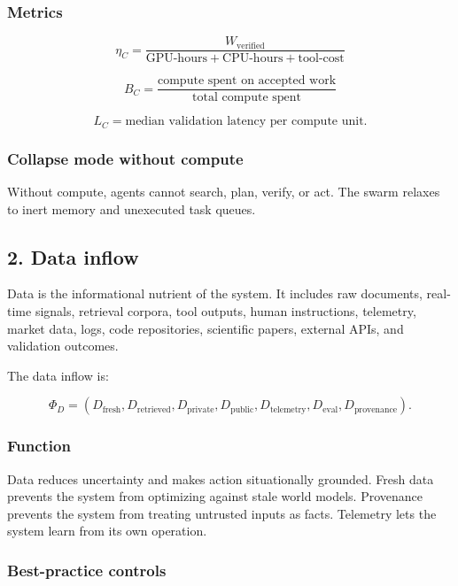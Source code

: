 \documentclass[11pt]{article}
\begin{document}
\subsubsection{Metrics}\label{metrics}

\[
\eta_C=\frac{W_{\text{verified}}}{\text{GPU-hours}+\text{CPU-hours}+\text{tool-cost}}
\]

\[
B_C=\frac{\text{compute spent on accepted work}}{\text{total compute spent}}
\]

\[
L_C=\text{median validation latency per compute unit}.
\]

\subsubsection{Collapse mode without
compute}\label{collapse-mode-without-compute}

Without compute, agents cannot search, plan, verify, or act. The swarm
relaxes to inert memory and unexecuted task queues.

\subsection{2. Data inflow}\label{data-inflow}

Data is the informational nutrient of the system. It includes raw
documents, real-time signals, retrieval corpora, tool outputs, human
instructions, telemetry, market data, logs, code repositories,
scientific papers, external APIs, and validation outcomes.

The data inflow is:

\[
\Phi_D=(D_{\text{fresh}},D_{\text{retrieved}},D_{\text{private}},D_{\text{public}},D_{\text{telemetry}},D_{\text{eval}},D_{\text{provenance}}).
\]

\subsubsection{Function}\label{function-1}

Data reduces uncertainty and makes action situationally grounded. Fresh
data prevents the system from optimizing against stale world models.
Provenance prevents the system from treating untrusted inputs as facts.
Telemetry lets the system learn from its own operation.

\subsubsection{Best-practice controls}\label{best-practice-controls-1}
\end{document}
